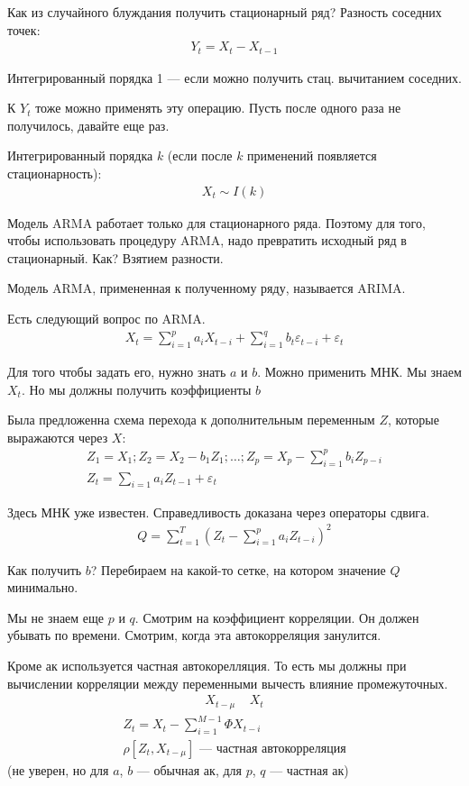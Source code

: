 \documentclass{book}
\begin{document}
Как из случайного блуждания получить стационарный ряд? Разность соседних точек:
\begin{gather*}
  Y_t=X_t-X_{t-1}
\end{gather*}

Интегрированный порядка 1 --- если можно получить стац. вычитанием соседних.

К $Y_t$ тоже можно применять эту операцию. Пусть после одного раза не получилось, давайте еще раз.

Интегрированный порядка $k$ (если после $k$ применений появляется стационарность):
\begin{gather*}
  X_t \sim I(k)
\end{gather*}

Модель ARMA работает только для стационарного ряда. Поэтому для того, чтобы использовать процедуру ARMA, надо превратить исходный ряд в стационарный. Как? Взятием разности.

Модель ARMA, примененная к полученному ряду, называется ARIMA.

Есть следующий вопрос по ARMA.
\begin{gather*}
  X_t=\sum_{i=1}^{p} {a_iX_{t-i}}+\sum_{i=1}^{q} {b_t\varepsilon_{t-i}}+\varepsilon_t
\end{gather*}

Для того чтобы задать его, нужно знать $a$ и $b$. Можно применить МНК. Мы знаем  $X_t$. Но мы должны получить коэффициенты  $b$

Была предложенна схема перехода к дополнительным переменным  $Z$, которые выражаются через  $X$:
\begin{gather*}
  Z_1=X_1; Z_2=X_2-b_1 Z_1; \dots; Z_p=X_{p}-\sum_{i=1}^{p} {b_i Z_{p-i}}\\
  Z_t=\sum_{i=1}^{} {a_iZ_{t-1}+\varepsilon_t}
\end{gather*}

Здесь МНК уже известен. Справедливость доказана через операторы сдвига.
\begin{gather*}
  Q=\sum_{t=1}^{T} {\left(Z_t-\sum_{i=1}^{p} {a_iZ_{t-i}}\right)^2}
\end{gather*}


Как получить $b$? Перебираем на какой-то сетке, на котором значение $Q$ минимально.

Мы не знаем еще $p$ и $q$. Смотрим на коэффициент корреляции. Он должен убывать по времени. Смотрим, когда эта автокорреляция занулится.

Кроме ак используется частная автокорелляция. То есть мы должны при вычислении корреляции между переменными вычесть влияние промежуточных.
\begin{gather*}
  X_{t-\mu}~~~~~X_t
\end{gather*}
\begin{gather*}
  Z_t=X_t-\sum_{i=1}^{M-1} {\Phi X_{t-i}}\\
  \rho\left[Z_t, X_{t-\mu}\right]\textrm{ --- частная автокорреляция}
\end{gather*}
(не уверен, но для $a$, $b$ --- обычная ак, для $p$, $q$ --- частная ак)
\end{document}
